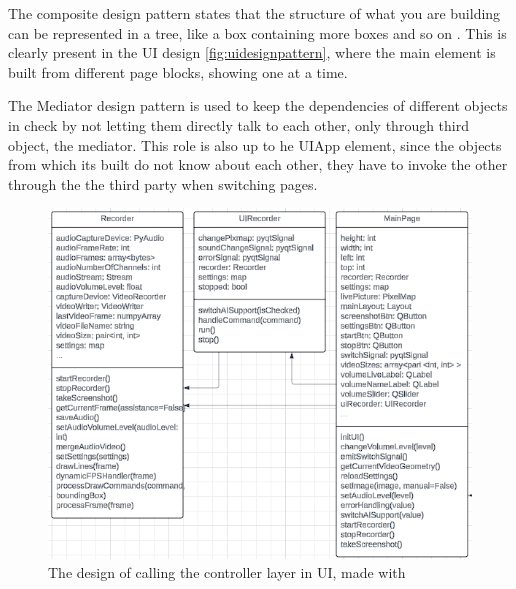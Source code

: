 \par The composite design pattern states that the structure of what you are building can be represented in a tree, like a box containing more boxes and so on \cite{composite}. This is clearly present in the UI design \ref{fig:uidesignpattern}, where the main element is built from different page blocks, showing one at a time. 
\par The Mediator design pattern is used to keep the dependencies of different objects in check by not letting them directly talk to each other, only through third object, the mediator\cite{mediator}. This role is also up to he UIApp element, since the objects from which its built do not know about each other, they have to invoke the other through the the third party when switching pages.  

\begin{figure}
    \centering
    \includegraphics[width=0.6\linewidth]{figures/UIRecorder.png}
    \caption{The design of calling the controller layer in UI, made with \cite{lucidchart}}
    \label{fig:UIRecorder}
\end{figure}

